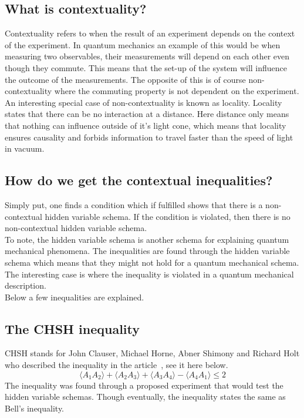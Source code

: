 \subsection{What is contextuality?}\label{sec:intro:Background of quantum mechanics:What is contextuality?}
Contextuality refers to when the result of an experiment depends on the context of the experiment. In quantum mechanics an example of this would be when measuring two observables, their measurements will depend on each other even though they commute. This means that the set-up of the system will influence the outcome of the measurements.
The opposite of this is of course non-contextuality where the commuting property is not dependent on the experiment.
An interesting special case of non-contextuality is known as locality. Locality states that there can be no interaction at a distance. Here distance only means that nothing can influence outside of it's light cone, which means that locality ensures causality and forbids information to travel faster than the speed of light in vacuum.
\subsection{How do we get the contextual inequalities?}
Simply put, one finds a condition which if fulfilled shows that there is a non-contextual hidden variable schema. If the condition is violated, then there is no non-contextual hidden variable schema.\\
To note, the hidden variable schema is another schema for explaining quantum mechanical phenomena. The inequalities are found through the hidden variable schema which means that they might not hold for a quantum mechanical schema. The interesting case is where the inequality is violated in a quantum mechanical description.\\
Below a few inequalities are explained.
\subsection{The CHSH inequality}\label{sec:intro:Background of quantum mechanics:The CHSH inequality}
CHSH stands for John Clauser, Michael Horne, Abner Shimony and Richard Holt who described the inequality in the article~\cite{PhysRevLett.23.880}, see it here below.
\begin{equation*}
\langle A_1 A_2 \rangle + \langle A_2 A_3 \rangle + \langle A_3 A_4 \rangle - \langle A_4 A_1 \rangle \leq 2
\end{equation*}
The inequality was found through a proposed experiment that would test the hidden variable schemas. Though eventually, the inequality states the same as Bell's inequality. 

